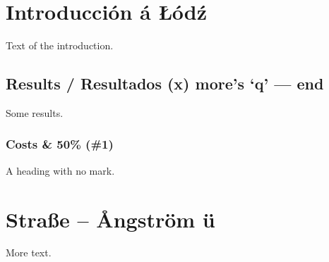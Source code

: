 \documentclass{article}
\begin{document}
\section{Introducción á Łódź}
Text of the introduction.
\subsection{Results / Resultados (x) more's ‘q’ — end}
Some results.
\subsubsection{Costs \& 50\% (\#1)}
A heading with no mark.
\newpage
\section{Straße – Ångström ü}
More text.
\end{document}
